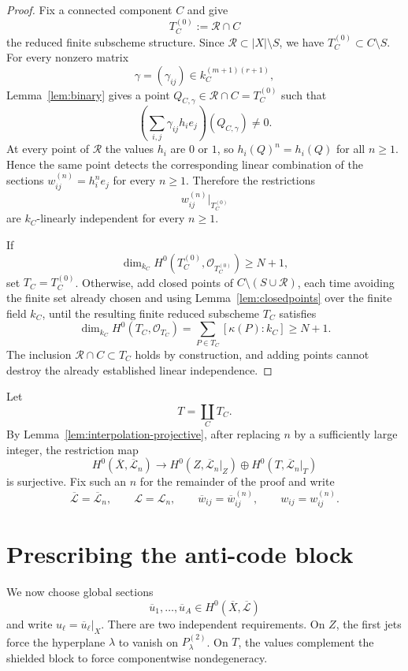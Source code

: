\documentclass{lms}
\newcommand{\OO}{\mathcal O}
\newcommand{\LL}{\mathcal L}
\newcommand{\kk}{\kappa}
\newcommand{\barX}{\overline{X}}
\begin{document}
\begin{proof}
Fix a connected component $C$ and give
\[
        T_C^{(0)}:=\mathcal R\cap C
\]
the reduced finite subscheme structure.  Since $\mathcal R\subset |X|\setminus S$, we have $T_C^{(0)}\subset C\setminus S$.  For every nonzero matrix
\[
        \gamma=(\gamma_{ij})\in k_C^{(m+1)(r+1)},
\]
Lemma~\ref{lem:binary} gives a point $Q_{C,\gamma}\in\mathcal R\cap C=T_C^{(0)}$ such that
\[
        \left(\sum_{i,j}\gamma_{ij}h_i e_j\right)(Q_{C,\gamma})\ne0.
\]
At every point of $\mathcal R$ the values $h_i$ are $0$ or $1$, so $h_i(Q)^n=h_i(Q)$ for all $n\ge1$.  Hence the same point detects the corresponding linear combination of the sections $w_{ij}^{(n)}=h_i^n e_j$ for every $n\ge1$.  Therefore the restrictions
\[
        w_{ij}^{(n)}|_{T_C^{(0)}}
\]
are $k_C$-linearly independent for every $n\ge1$.

If
\[
        \dim_{k_C}H^0(T_C^{(0)},\OO_{T_C^{(0)}})\ge N+1,
\]
set $T_C=T_C^{(0)}$.  Otherwise, add closed points of $C\setminus(S\cup\mathcal R)$, each time avoiding the finite set already chosen and using Lemma~\ref{lem:closedpoints} over the finite field $k_C$, until the resulting finite reduced subscheme $T_C$ satisfies
\[
        \dim_{k_C}H^0(T_C,\OO_{T_C})
        =\sum_{P\in T_C}[\kk(P):k_C]
        \ge N+1.
\]
The inclusion $\mathcal R\cap C\subset T_C$ holds by construction, and adding points cannot destroy the already established linear independence.
\end{proof}

Let
\[
        T=\coprod_C T_C.
\]
By Lemma~\ref{lem:interpolation-projective}, after replacing $n$ by a sufficiently large integer, the restriction map
\begin{equation}\label{eq:globalinterpolation}
        H^0(\barX,\overline{\LL}_n)
        \longrightarrow
        H^0(Z,\overline{\LL}_n|_Z)\oplus H^0(T,\overline{\LL}_n|_T)
\end{equation}
is surjective.  Fix such an $n$ for the remainder of the proof and write
\[
        \overline{\LL}=\overline{\LL}_n,
        \qquad
        \LL=\LL_n,
        \qquad
        \overline w_{ij}=\overline w_{ij}^{(n)},
        \qquad
        w_{ij}=w_{ij}^{(n)}.
\]

\section{Prescribing the anti-code block}\label{sec:anticode}

We now choose global sections
\[
        \overline u_1,\ldots,\overline u_A\in H^0(\barX,\overline{\LL})
\]
and write $u_\ell=\overline u_\ell|_X$.
There are two independent requirements.  On $Z$, the first jets force the hyperplane $\lambda$ to vanish on $P_\lambda^{(2)}$.  On $T$, the values complement the shielded block to force componentwise nondegeneracy.
\end{document}
